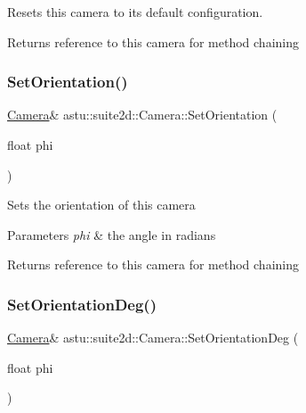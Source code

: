 Resets this camera to its default configuration.

\begin{DoxyReturn}{Returns}
reference to this camera for method chaining 
\end{DoxyReturn}
\mbox{\label{classastu_1_1suite2d_1_1Camera_a6885dcb17c88b435d7d90d06b60bbcb0}} 
\subsubsection{\texorpdfstring{Set\+Orientation()}{SetOrientation()}}
{\footnotesize\ttfamily \hyperlink{classastu_1_1suite2d_1_1Camera}{Camera}\& astu\+::suite2d\+::\+Camera\+::\+Set\+Orientation (\begin{DoxyParamCaption}\item[{float}]{phi }\end{DoxyParamCaption})}

Sets the orientation of this camera


\begin{DoxyParams}{Parameters}
{\em phi} & the angle in radians \\
\hline
\end{DoxyParams}
\begin{DoxyReturn}{Returns}
reference to this camera for method chaining 
\end{DoxyReturn}
\mbox{\label{classastu_1_1suite2d_1_1Camera_a97ded73b2b33b3dae8465f6afa9f071c}} 
\subsubsection{\texorpdfstring{Set\+Orientation\+Deg()}{SetOrientationDeg()}}
{\footnotesize\ttfamily \hyperlink{classastu_1_1suite2d_1_1Camera}{Camera}\& astu\+::suite2d\+::\+Camera\+::\+Set\+Orientation\+Deg (\begin{DoxyParamCaption}\item[{float}]{phi }\end{DoxyParamCaption})\hspace{0.3cm}{\ttfamily [inline]}}

